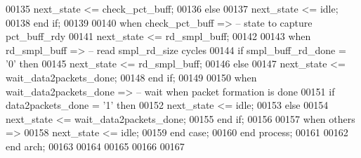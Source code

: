 \begin{DoxyCode}
00135             \textcolor{vhdlchar}{next_state} \textcolor{vhdlchar}{<=} \textcolor{vhdlchar}{check\_pct\_buff};
00136          \textcolor{keywordflow}{else}
00137             \textcolor{vhdlchar}{next_state} \textcolor{vhdlchar}{<=} \textcolor{vhdlchar}{idle};
00138          \textcolor{keywordflow}{end} \textcolor{keywordflow}{if};
00139        
00140       \textcolor{keywordflow}{when} \textcolor{vhdlchar}{check\_pct\_buff} \textcolor{vhdlchar}{=}\textcolor{vhdlchar}{>}\textcolor{keyword}{        -- state to capture pct\_buff\_rdy }
00141             \textcolor{vhdlchar}{next_state} \textcolor{vhdlchar}{<=} \textcolor{vhdlchar}{rd\_smpl\_buff};
00142                
00143       \textcolor{keywordflow}{when} \textcolor{vhdlchar}{rd\_smpl\_buff} \textcolor{vhdlchar}{=}\textcolor{vhdlchar}{>}\textcolor{keyword}{          -- read smpl\_rd\_size cycles}
00144          \textcolor{keywordflow}{if} \textcolor{vhdlchar}{smpl_buff_rd_done} \textcolor{vhdlchar}{=} \textcolor{vhdlchar}{'}\textcolor{vhdllogic}{}\textcolor{vhdllogic}{0}\textcolor{vhdlchar}{'} \textcolor{keywordflow}{then} 
00145             \textcolor{vhdlchar}{next_state} \textcolor{vhdlchar}{<=} \textcolor{vhdlchar}{rd\_smpl\_buff};
00146          \textcolor{keywordflow}{else} 
00147             \textcolor{vhdlchar}{next_state} \textcolor{vhdlchar}{<=} \textcolor{vhdlchar}{wait\_data2packets\_done};
00148          \textcolor{keywordflow}{end} \textcolor{keywordflow}{if};
00149         
00150       \textcolor{keywordflow}{when} \textcolor{vhdlchar}{wait\_data2packets\_done} \textcolor{vhdlchar}{=}\textcolor{vhdlchar}{>}\textcolor{keyword}{ -- wait when packet formation is done}
00151          \textcolor{keywordflow}{if} \textcolor{vhdlchar}{data2packets_done} \textcolor{vhdlchar}{=} \textcolor{vhdlchar}{'}\textcolor{vhdllogic}{}\textcolor{vhdllogic}{1}\textcolor{vhdlchar}{'} \textcolor{keywordflow}{then} 
00152             \textcolor{vhdlchar}{next_state} \textcolor{vhdlchar}{<=} \textcolor{vhdlchar}{idle}; 
00153          \textcolor{keywordflow}{else} 
00154             \textcolor{vhdlchar}{next_state} \textcolor{vhdlchar}{<=} \textcolor{vhdlchar}{wait\_data2packets\_done};
00155          \textcolor{keywordflow}{end} \textcolor{keywordflow}{if};
00156             
00157         \textcolor{keywordflow}{when} \textcolor{keywordflow}{others} \textcolor{vhdlchar}{=}\textcolor{vhdlchar}{>} 
00158             \textcolor{vhdlchar}{next_state} \textcolor{vhdlchar}{<=} \textcolor{vhdlchar}{idle};
00159     \textcolor{keywordflow}{end} \textcolor{keywordflow}{case};
00160 \textcolor{keywordflow}{end} \textcolor{keywordflow}{process};
00161   
00162 \textcolor{keywordflow}{end} \textcolor{vhdlchar}{arch};   
00163 
00164 
00165 
00166 
00167 
\end{DoxyCode}
